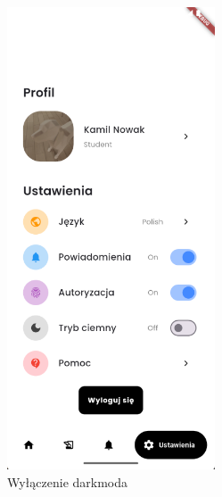 \begin{figure}[h!]
	\centering
	\includegraphics[width=0.55\textwidth]{rys/whitemode.png}
	\caption{Wyłączenie darkmoda}
	\label{rys:whitemode}
\end{figure}

\newpage
